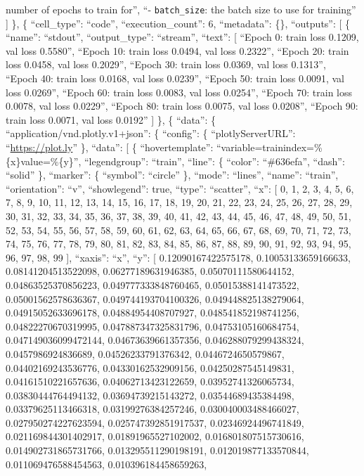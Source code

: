 \documentclass[
]{article}
\begin{document}
number of epochs to train for\n'', ``- \texttt{batch\_size}: the batch
size to use for training'' {]} \}, \{ ``cell\_type'': ``code'',
``execution\_count'': 6, ``metadata'': \{\}, ``outputs'': {[} \{
``name'': ``stdout'', ``output\_type'': ``stream'', ``text'': {[}
``Epoch 0: train loss 0.1209, val loss 0.5580\n'', ``Epoch 10: train
loss 0.0494, val loss 0.2322\n'', ``Epoch 20: train loss 0.0458, val
loss 0.2029\n'', ``Epoch 30: train loss 0.0369, val loss 0.1313\n'',
``Epoch 40: train loss 0.0168, val loss 0.0239\n'', ``Epoch 50: train
loss 0.0091, val loss 0.0269\n'', ``Epoch 60: train loss 0.0083, val
loss 0.0254\n'', ``Epoch 70: train loss 0.0078, val loss 0.0229\n'',
``Epoch 80: train loss 0.0075, val loss 0.0208\n'', ``Epoch 90: train
loss 0.0071, val loss 0.0192\n'' {]} \}, \{ ``data'': \{
``application/vnd.plotly.v1+json'': \{ ``config'': \{
``plotlyServerURL'': ``\url{https://plot.ly}'' \}, ``data'': {[} \{
``hovertemplate'': ``variable=trainindex=\%\{x\}value=\%\{y\}'',
``legendgroup'': ``train'', ``line'': \{ ``color'': ``\#636efa'',
``dash'': ``solid'' \}, ``marker'': \{ ``symbol'': ``circle'' \},
``mode'': ``lines'', ``name'': ``train'', ``orientation'': ``v'',
``showlegend'': true, ``type'': ``scatter'', ``x'': {[} 0, 1, 2, 3, 4,
5, 6, 7, 8, 9, 10, 11, 12, 13, 14, 15, 16, 17, 18, 19, 20, 21, 22, 23,
24, 25, 26, 27, 28, 29, 30, 31, 32, 33, 34, 35, 36, 37, 38, 39, 40, 41,
42, 43, 44, 45, 46, 47, 48, 49, 50, 51, 52, 53, 54, 55, 56, 57, 58, 59,
60, 61, 62, 63, 64, 65, 66, 67, 68, 69, 70, 71, 72, 73, 74, 75, 76, 77,
78, 79, 80, 81, 82, 83, 84, 85, 86, 87, 88, 89, 90, 91, 92, 93, 94, 95,
96, 97, 98, 99 {]}, ``xaxis'': ``x'', ``y'': {[} 0.12090167422575178,
0.10053133659166633, 0.08141204513522098, 0.06277189631946385,
0.05070111580644152, 0.04863525370856223, 0.049777333848760465,
0.05015388141473522, 0.05001562578636367, 0.049744193704100326,
0.049448825138279064, 0.04915052633696178, 0.04884954408707927,
0.048541852198741256, 0.04822270670319995, 0.047887347325831796,
0.04753105160684754, 0.047149036099472144, 0.04673639661357356,
0.046288079299438324, 0.0457986924836689, 0.04526233791376342,
0.0446724650579867, 0.04402169243536776, 0.04330162532909156,
0.04250287545149831, 0.04161510221657636, 0.04062713423122659,
0.03952741326065734, 0.03830444764494132, 0.03694739215143272,
0.03544689435384498, 0.03379625113466318, 0.03199276384257246,
0.030040003488466027, 0.027950274227623594, 0.025747392851917537,
0.02346924496741849, 0.021169844301402917, 0.01891965527102002,
0.016801807515730616, 0.014902731865731766, 0.013295511290198191,
0.012019877133570844, 0.011069476588454563, 0.010396184458659263,
\end{document}
